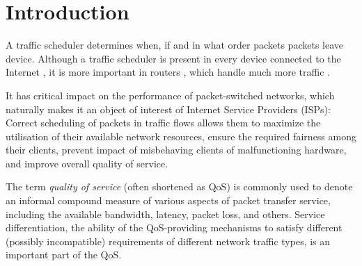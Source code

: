 \chapter*{Introduction}

A  traffic scheduler determines when, if and in what order  packets  packets leave  device. Although a traffic scheduler is present in every device connected to the Internet , it is more important in routers , which handle much more traffic .

It has  critical impact on the performance of packet-switched networks, which naturally makes it  an object of interest of Internet Service Providers (ISPs):  Correct scheduling of packets in traffic flows allows them to maximize the utilisation of their available network resources, ensure the required fairness among their clients, prevent impact of misbehaving clients of malfunctioning hardware, and improve overall quality of service.

The term \emph{quality of service} (often shortened as QoS) is commonly used to denote an informal compound measure of various aspects of packet transfer service, including the available bandwidth, latency, packet loss, and others. Service differentiation, the ability of the QoS-providing mechanisms to satisfy different (possibly incompatible) requirements of different network traffic types, is an important part of the QoS.


